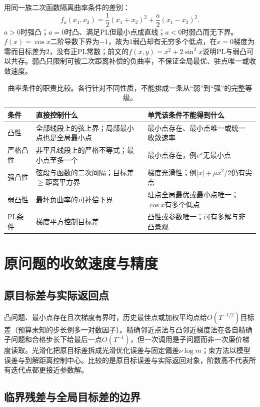 用同一族二次函数隔离曲率条件的差别：
\[
 f_a(x_1,x_2)=\frac12(x_1+x_2)^2+\frac a2(x_1-x_2)^2.
\]
$a>0$时强凸；$a=0$时凸、满足PL但最小点成直线；$a<0$时弱凸而无下界。$f(x)=\cos x$二阶导数下界为$-1$，故为$1$弱凸却有无穷多个低点，在$x=0$梯度为零而目标差为$2$，没有正PL常数；前文的$f(x,y)=x^2+2\sin^2x$说明PL与弱凸可以共存。弱凸只限制可被二次距离补偿的负曲率，不保证全局最优、驻点唯一或收敛速度。

\begin{table}[htbp]
 \centering\small
 \begin{tabularx}{\linewidth}{@{}lXX@{}}
 \toprule
 条件 & 直接控制什么 & 单凭该条件不能得到什么 \\
 \midrule
 凸性 & 全部线段上的弦上界；局部最小点也是全局最小点 & 最小点存在、最小点唯一或统一收敛速率 \\
 严格凸性 & 非平凡线段上的严格不等式；最小点至多一个 & 最小点存在，例$e^x$无最小点 \\
 强凸性 & 弦段与函数的二次间隔；目标差$\geq$距离平方界 & 梯度光滑性；例$|x|+\mu x^2/2$仍有尖点 \\
 弱凸性 & 最坏负曲率的可补偿下界 & 驻点全局最优或最小点唯一；$\cos x$有多个低点 \\
 PL条件 & 梯度平方控制目标差 & 凸性或参数唯一；可有多解与非凸景观 \\
 \bottomrule
 \end{tabularx}
 \caption{曲率条件的职责比较。各行针对不同性质，不能排成一条从“弱”到“强”的完整等级。}
 \label{tab:opt-curvature-conditions}
\end{table}

\section{原问题的收敛速度与精度}

\subsection{原目标差与实际返回点}

凸问题、最小点存在且次梯度有界时，历史最佳点或加权平均点给$O(T^{-1/2})$目标差（预算未知的步长例多一对数因子）。精确邻近点法与凸邻近梯度法在各自精确子问题和合格步长下给最后一点$O(T^{-1})$，但一次调用是子问题而非一次廉价梯度读取。光滑化把原目标差拆成光滑优化误差与固定偏差$\nu\log m$；束方法以模型误差与到解距离控制中心。比较的是原目标误差与实际返回对象，阶数高不代表所有迭代点都更接近参数解。

\subsection{临界残差与全局目标差的边界}

